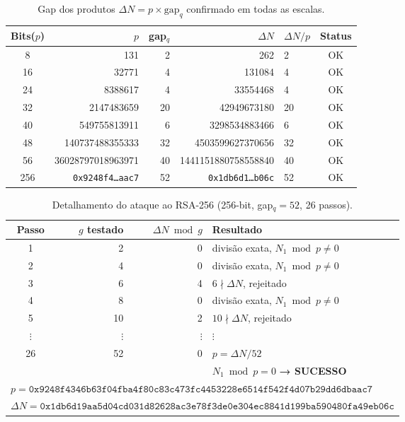 \documentclass[12pt,a4paper]{article}
\theoremstyle{plain}
\begin{document}
\begin{table}[htbp]
\centering
\caption{Gap dos produtos $\Delta N = p \times \text{gap}_q$ confirmado
em todas as escalas.}
\label{tab:gap_produto}
\begin{tabular}{crrrlc}
\hline
Bits($p$) & $p$ & gap$_q$ & $\Delta N$ & $\Delta N / p$ & Status \\
\hline
8  & 131 & 2  & 262            & 2  & OK \\
16 & 32771 & 4  & 131084          & 4  & OK \\
24 & 8388617 & 4  & 33554468         & 4  & OK \\
32 & 2147483659 & 20 & 42949673180       & 20 & OK \\
40 & 549755813911 & 6  & 3298534883466     & 6  & OK \\
48 & 140737488355333 & 32 & 4503599627370656   & 32 & OK \\
56 & 36028797018963971 & 40 & 1441151880758558840 & 40 & OK \\
256 & \texttt{0x9248f4\ldots aac7} & 52 & \texttt{0x1db6d1\ldots b06c} & 52 & OK \\
\hline
\end{tabular}
\end{table}

\begin{table}[H]
\centering
\caption{Detalhamento do ataque ao RSA-256 (256-bit, gap$_q = 52$, 26 passos).}
\label{tab:rsa256_detalhe}
\begin{tabular}{crrl}
\hline
Passo & $g$ testado & $\Delta N \bmod g$ & Resultado \\
\hline
1  & 2  & 0 & divisão exata, $N_1 \bmod p \neq 0$ \\
2  & 4  & 0 & divisão exata, $N_1 \bmod p \neq 0$ \\
3  & 6  & 4 & $6 \nmid \Delta N$, rejeitado \\
4  & 8  & 0 & divisão exata, $N_1 \bmod p \neq 0$ \\
5  & 10 & 2 & $10 \nmid \Delta N$, rejeitado \\
$\vdots$ & $\vdots$ & $\vdots$ & $\vdots$ \\
26 & 52 & 0 & $p = \Delta N / 52$ \\[2pt]
   &    &   & $N_1 \bmod p = 0$ \textbf{→ SUCESSO} \\
\hline
\multicolumn{4}{l}{\small $p = \mathtt{0x9248f4346b63f04fba4f80c83c473fc4453228e6514f542f4d07b29dd6dbaac7}$} \\
\multicolumn{4}{l}{\small $\Delta N = \mathtt{0x1db6d19aa5d04cd031d82628ac3e78f3de0e304ec8841d199ba590480fa49eb06c}$} \\
\end{tabular}
\end{table}
\end{document}
